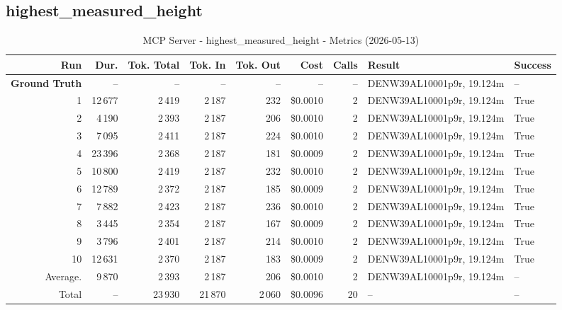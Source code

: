 \documentclass[a4paper,11pt]{article}
\begin{document}
\clearpage
\subsection{highest\_measured\_height}

\begin{table}[ht]
\centering
\scriptsize
\caption{MCP Server - highest\_measured\_height - Metrics (2026-05-13)}
\label{tab:mcp\_highest\_measured\_height\_metrics\_2026-05-13}
\begin{tabular}{r r r r r r r p{3cm} l}
\hline
Run & Dur. & Tok. Total & Tok. In & Tok. Out & Cost & Calls & Result & Success \\
\hline
\textbf{Ground Truth} & -- & -- & -- & -- & -- & -- & DENW39AL10001p9r, 19.124m & -- \\
\hline
1 & 12\,677 & 2\,419 & 2\,187 & 232 & \$0.0010 & 2 & DENW39AL10001p9r, 19.124m & True \\
2 & 4\,190 & 2\,393 & 2\,187 & 206 & \$0.0010 & 2 & DENW39AL10001p9r, 19.124m & True \\
3 & 7\,095 & 2\,411 & 2\,187 & 224 & \$0.0010 & 2 & DENW39AL10001p9r, 19.124m & True \\
4 & 23\,396 & 2\,368 & 2\,187 & 181 & \$0.0009 & 2 & DENW39AL10001p9r, 19.124m & True \\
5 & 10\,800 & 2\,419 & 2\,187 & 232 & \$0.0010 & 2 & DENW39AL10001p9r, 19.124m & True \\
6 & 12\,789 & 2\,372 & 2\,187 & 185 & \$0.0009 & 2 & DENW39AL10001p9r, 19.124m & True \\
7 & 7\,882 & 2\,423 & 2\,187 & 236 & \$0.0010 & 2 & DENW39AL10001p9r, 19.124m & True \\
8 & 3\,445 & 2\,354 & 2\,187 & 167 & \$0.0009 & 2 & DENW39AL10001p9r, 19.124m & True \\
9 & 3\,796 & 2\,401 & 2\,187 & 214 & \$0.0010 & 2 & DENW39AL10001p9r, 19.124m & True \\
10 & 12\,631 & 2\,370 & 2\,187 & 183 & \$0.0009 & 2 & DENW39AL10001p9r, 19.124m & True \\
\hline
Average. & 9\,870 & 2\,393 & 2\,187 & 206 & \$0.0010 & 2 & DENW39AL10001p9r, 19.124m & -- \\
Total & -- & 23\,930 & 21\,870 & 2\,060 & \$0.0096 & 20 & -- & -- \\
\hline
\end{tabular}
\end{table}

\clearpage
\end{document}
